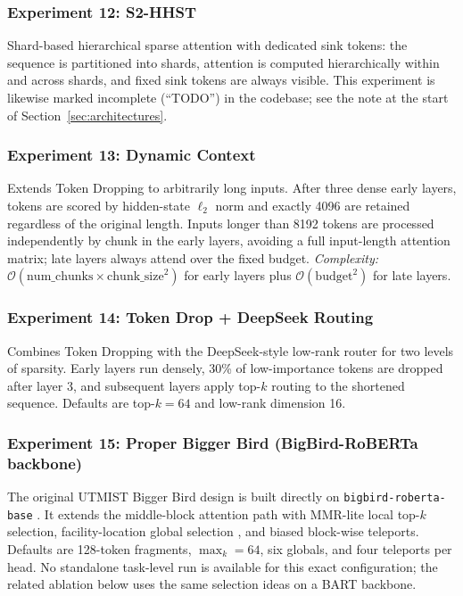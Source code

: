 \documentclass[11pt]{article}
\newcommand{\bigO}{\mathcal{O}}
\begin{document}
\subsubsection*{Experiment 12: S2-HHST}
\label{exp:s2hhst}
Shard-based hierarchical sparse attention with dedicated sink tokens: the
sequence is partitioned into shards, attention is computed hierarchically
within and across shards, and fixed sink tokens are always visible. This
experiment is likewise marked incomplete (``TODO'') in the codebase; see the
note at the start of Section~\ref{sec:architectures}.

\subsubsection*{Experiment 13: Dynamic Context}
\label{exp:dynamic-context}
Extends Token Dropping to arbitrarily long inputs. After three dense early
layers, tokens are scored by hidden-state $\ell_2$ norm and exactly 4096 are
retained regardless of the original length. Inputs longer than 8192 tokens
are processed independently by chunk in the early layers, avoiding a full
input-length attention matrix; late layers always attend over the fixed
budget. \emph{Complexity:}
$\bigO(\mathrm{num\_chunks}\times\mathrm{chunk\_size}^2)$ for early layers
plus $\bigO(\mathrm{budget}^2)$ for late layers.

\subsubsection*{Experiment 14: Token Drop + DeepSeek Routing}
\label{exp:token-drop-deepseek}
Combines Token Dropping with the DeepSeek-style low-rank router for two levels
of sparsity. Early layers run densely, 30\% of low-importance tokens are
dropped after layer 3, and subsequent layers apply top-$k$ routing to the
shortened sequence. Defaults are top-$k=64$ and low-rank dimension 16.

\subsubsection*{Experiment 15: Proper Bigger Bird (BigBird-RoBERTa backbone)}
\label{exp:proper-bb}
The original UTMIST Bigger Bird design is built directly on
\texttt{bigbird-roberta-base} \citep{zaheer2020bigbird}. It extends the
middle-block attention path with MMR-lite local top-$k$ selection,
facility-location global selection \citep{lin2011submodular}, and biased
block-wise teleports. Defaults are 128-token fragments, $\max_k=64$, six
globals, and four teleports per head. No standalone task-level run is
available for this exact configuration; the related ablation below uses the
same selection ideas on a BART backbone.
\end{document}
